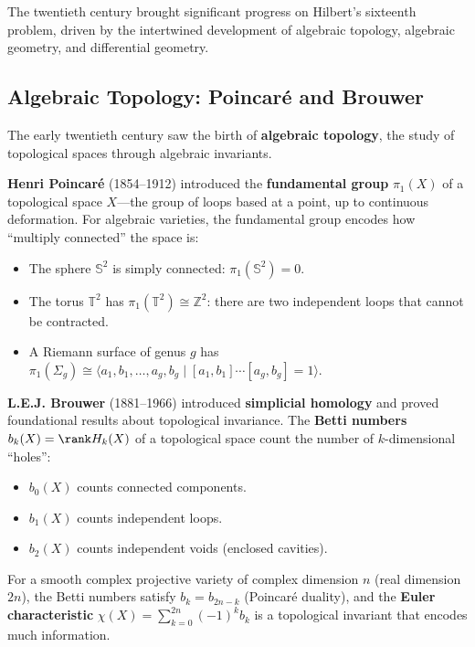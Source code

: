 The twentieth century brought significant progress on Hilbert's sixteenth problem, driven by the intertwined development of algebraic topology, algebraic geometry, and differential geometry.

\subsection{Algebraic Topology: Poincar\'e and Brouwer}

The early twentieth century saw the birth of \textbf{algebraic topology}, the study of topological spaces through algebraic invariants.

\textbf{Henri Poincar\'e} (1854--1912) introduced the \textbf{fundamental group} $\pi_1(X)$ of a topological space $X$---the group of loops based at a point, up to continuous deformation. For algebraic varieties, the fundamental group encodes how ``multiply connected'' the space is:
\begin{itemize}
    \item The sphere $\mathbb{S}^2$ is simply connected: $\pi_1(\mathbb{S}^2) = 0$.
    \item The torus $\mathbb{T}^2$ has $\pi_1(\mathbb{T}^2) \cong \mathbb{Z}^2$: there are two independent loops that cannot be contracted.
    \item A Riemann surface of genus $g$ has $\pi_1(\Sigma_g) \cong \langle a_1, b_1, \ldots, a_g, b_g \mid [a_1, b_1] \cdots [a_g, b_g] = 1 \rangle$.
\end{itemize}

\textbf{L.E.J. Brouwer} (1881--1966) introduced \textbf{simplicial homology} and proved foundational results about topological invariance. The \textbf{Betti numbers} $b_k(X) = \rank H_k(X)$ of a topological space count the number of $k$-dimensional ``holes'':
\begin{itemize}
    \item $b_0(X)$ counts connected components.
    \item $b_1(X)$ counts independent loops.
    \item $b_2(X)$ counts independent voids (enclosed cavities).
\end{itemize}

For a smooth complex projective variety of complex dimension $n$ (real dimension $2n$), the Betti numbers satisfy $b_k = b_{2n-k}$ (Poincar\'e duality), and the \textbf{Euler characteristic} $\chi(X) = \sum_{k=0}^{2n} (-1)^k b_k$ is a topological invariant that encodes much information.

